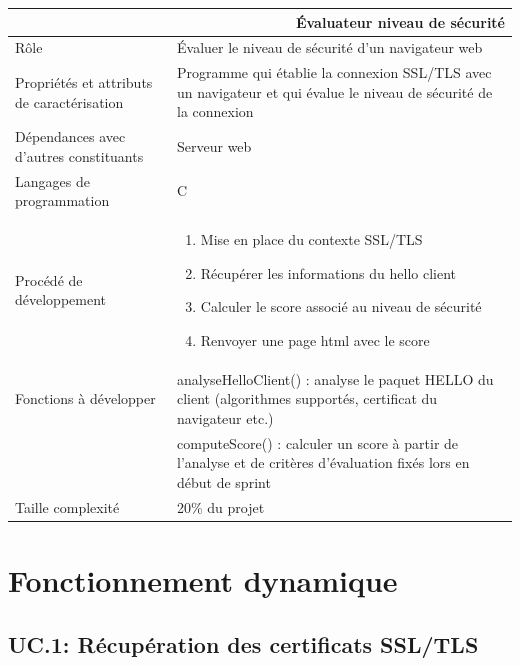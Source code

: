\documentclass[a4paper,11pt,french]{article}
\begin{document}
\begin{center}
	\vspace*{0.7cm}
	\begin{tabularx}{16cm}{|l|X|}
	\hline
	\multicolumn{2}{|r|}{\textbf{Évaluateur niveau de sécurité}}\\
	\hline
	R\^ole & Évaluer le niveau de sécurité d'un navigateur web \\
	\hline
	Propriétés et attributs de caractérisation & Programme qui établie la connexion SSL/TLS avec un navigateur et qui évalue le niveau de sécurité de la connexion\\
	\hline
	Dépendances avec d'autres constituants & Serveur web \\
	\hline
	Langages de programmation & C\\
	\hline
	Procédé de développement & \begin{enumerate} \item Mise en place du contexte SSL/TLS \item Récupérer les informations du hello client \item Calculer le score associé au niveau de sécurité \item Renvoyer une page html avec le score \end{enumerate}\\
	\hline
	Fonctions à développer & analyseHelloClient() : analyse le paquet HELLO du client (algorithmes supportés, certificat du navigateur etc.)\\
	& computeScore() : calculer un score à partir de l'analyse et de critères d'évaluation fixés lors en début de sprint\\
	\hline
	Taille complexité & 20\% du projet\\
	\hline
	\end{tabularx}
\end{center}

\newpage
\section{Fonctionnement dynamique}

\subsection{UC.1: Récupération des certificats SSL/TLS}
\end{document}

